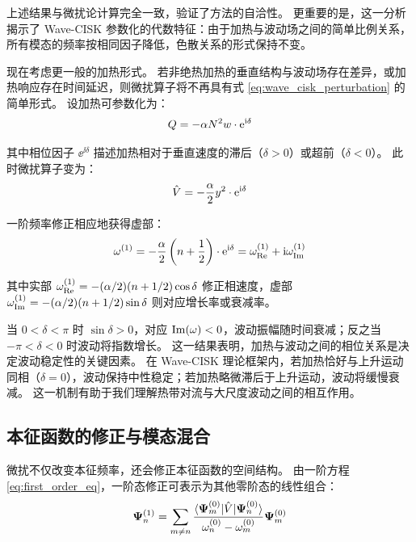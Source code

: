 上述结果与微扰论计算完全一致，验证了方法的自洽性。
更重要的是，这一分析揭示了 Wave-CISK 参数化的代数特征：由于加热与波动场之间的简单比例关系，所有模态的频率按相同因子降低，色散关系的形式保持不变。

现在考虑更一般的加热形式。
若非绝热加热的垂直结构与波动场存在差异，或加热响应存在时间延迟，则微扰算子将不再具有式 \eqref{eq:wave_cisk_perturbation} 的简单形式。
设加热可参数化为：
\begin{equation}
    Q = -\alpha N^2 w \cdot \mathrm{e}^{\mathrm{i}\delta}
    \label{eq:phase_shifted_heating}
\end{equation}

其中相位因子 $\ee^{\ii\delta}$ 描述加热相对于垂直速度的滞后（$\delta > 0$）或超前（$\delta < 0$）。
此时微扰算子变为：
\begin{equation}
    \hat{V} = -\frac{\alpha}{2} y^2 \cdot \mathrm{e}^{\mathrm{i}\delta}
    \label{eq:complex_perturbation}
\end{equation}

一阶频率修正相应地获得虚部：
\begin{equation}
    \omega^{(1)} = -\frac{\alpha}{2} \left( n + \frac{1}{2} \right) \cdot \mathrm{e}^{\mathrm{i}\delta} = \omega^{(1)}_{\mathrm{Re}} + \mathrm{i} \omega^{(1)}_{\mathrm{Im}}
    \label{eq:complex_frequency}
\end{equation}

其中实部 $\omega^{(1)}_{\mathrm{Re}} = -(\alpha/2)(n + 1/2)\cos\delta$ 修正相速度，虚部 $\omega^{(1)}_{\mathrm{Im}} = -(\alpha/2)(n + 1/2)\sin\delta$ 则对应增长率或衰减率。

当 $0 < \delta < \pi$ 时 $\sin\delta > 0$，对应 $\mathrm{Im}(\omega) < 0$，波动振幅随时间衰减；反之当 $-\pi < \delta < 0$ 时波动将指数增长。
这一结果表明，加热与波动之间的相位关系是决定波动稳定性的关键因素。
在 Wave-CISK 理论框架内，若加热恰好与上升运动同相（$\delta = 0$），波动保持中性稳定；若加热略微滞后于上升运动，波动将缓慢衰减。
这一机制有助于我们理解热带对流与大尺度波动之间的相互作用。

\subsection{本征函数的修正与模态混合}
\label{subsec:mode_mixing}

微扰不仅改变本征频率，还会修正本征函数的空间结构。
由一阶方程 \eqref{eq:first_order_eq}，一阶态修正可表示为其他零阶态的线性组合：
\begin{equation}
    \bm{\Psi}_n^{(1)} = \sum_{m \neq n} \frac{\langle \bm{\Psi}_m^{(0)} | \hat{V} | \bm{\Psi}_n^{(0)} \rangle}{\omega_n^{(0)} - \omega_m^{(0)}} \bm{\Psi}_m^{(0)}
    \label{eq:state_correction}
\end{equation}

